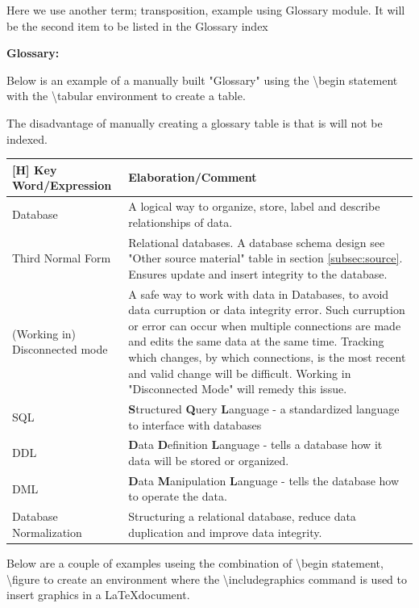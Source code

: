 {Here we use another term; \gls{transposition}, example using Glossary module. It will be the second item to be listed in the Glossary index


{\bfseries{Glossary:}}

\begin{notes}
    Below is an example of a manually built "Glossary" using the \textbackslash begin statement with the \textbackslash tabular environment to create a table.

    The disadvantage of manually creating a glossary table is that is will not be indexed. 
\end{notes}

\begin{tabular}{p{40mm} | p{120mm}}[H]
    {\bfseries{Key Word/Expression}} & {\bfseries{Elaboration/Comment}}\\ \hline
    Database & A logical way to organize, store, label and describe relationships of data.\\ \hline
    Third Normal Form & Relational databases. A database schema design see "Other source material" table in section \ref{subsec:source}. Ensures update and insert integrity to the database.\\ \hline
    (Working in) Disconnected mode & A safe way to work with data in Databases, to avoid data curruption or data integrity error. Such curruption or error can occur when multiple connections are made and edits the same data at the same time. Tracking which changes, by which connections, is the most recent and valid change will be difficult. Working in "Disconnected Mode" will remedy this issue.\\ \hline
    SQL & {\bfseries{S}}tructured {\bfseries{Q}}uery {\bfseries{L}}anguage - a standardized language to interface with databases\\ \hline
    DDL & {\bfseries{D}}ata {\bfseries{D}}efinition {\bfseries{L}}anguage - tells a database how it data will be stored or organized. \\ \hline
    DML & {\bfseries{D}}ata {\bfseries{M}}anipulation {\bfseries{L}}anguage - tells the database how to operate the data. \\ \hline
    Database Normalization & Structuring a relational database, reduce data duplication and improve data integrity. \\ \hline
\end{tabular}

\begin{notes}
    Below are a couple of examples useing the combination of \textbackslash begin statement, \textbackslash figure to create an environment where the \textbackslash includegraphics command is used to insert graphics in a \LaTeX document.
\end{notes}

}
